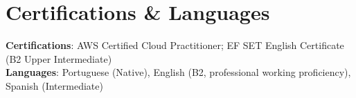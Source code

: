 \documentclass[letterpaper,11pt]{article}
\begin{document}
\section{Certifications \& Languages}
 \begin{itemize}[leftmargin=0.15in, label={}]
    \small{\item{
     \textbf{Certifications}: AWS Certified Cloud Practitioner; EF SET English Certificate (B2 Upper Intermediate) \\
     \textbf{Languages}: Portuguese (Native), English (B2, professional working proficiency), Spanish (Intermediate)
    }}
 \end{itemize}
\end{document}
